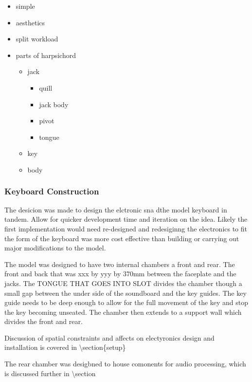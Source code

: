 \begin{itemize}
\item
  simple
\item
  aesthetics
\item
  split workload
\item
  parts of harpsichord

  \begin{itemize}
  \item
    jack

    \begin{itemize}
    \item
      quill
    \item
      jack body
    \item
      pivot
    \item
      tongue
    \end{itemize}
  \item
    key
  \item
    body
  \end{itemize}
\end{itemize}

\subsubsection{Keyboard Construction}\label{keyboard-construction}

The desicion was made to design the elctronic sna dthe model keyboard in
tandem. Allow for quicker development time and iteration on the idea.
Likely the first implementation would need re-designed and redesiginng
the electronics to fit the form of the keyboard was more cost effective
than building or carrying out major modifications to the model.

The model was designed to have two internal chambers a front and rear.
The front and back that was xxx by yyy by 370mm between the faceplate
and the jacks. The TONGUE THAT GOES INTO SLOT divides the chamber though
a small gap between the under side of the soundboard and the key guides.
The key guide needs to be deep enough to allow for the full movement of
the key and stop the key becoming unseated. The chamber then extends to
a support wall which divides the front and rear.

Discussion of spatial constraints and affects on electyronics design and
installation is covered in \textbackslash section\{setup\}

The rear chamber was desigbned to house comonents for audio processing,
which is discussed further in \textbackslash section

